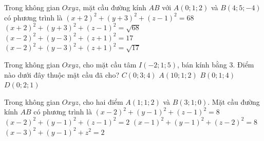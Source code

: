 \begin{ex}%
	 Trong không gian $Oxyz$, mặt cầu đường kính $AB$ với $A\left(0;1;2\right)$ và $B\left(4;5;-4\right)$ có phương trình là
	 \choice
		 {$\left(x+2\right)^2+\left(y+3\right)^2+\left(z-1\right)^2=68$}
		{$\left(x+2\right)^2+\left(y+3\right)^2+\left(z-1\right)^2=\sqrt{68}$} 
		{\True  $\left(x-2\right)^2+\left(y-3\right)^2+\left(z+1\right)^2=17$}
		{$\left(x-2\right)^2+\left(y-3\right)^2+\left(z+1\right)^2=\sqrt{17}$} 
\end{ex}

\begin{ex}%
	Trong không gian $Oxyz$, cho mặt cầu tâm $I(-2;1;5)$, bán kính bằng $3$. Điểm nào dưới đây  thuộc mặt cầu đã cho?
	\choice 
		{\True  $C(0;3;4)$}
		 {$A(10;1;2)$}
		{$B(0;1;4)$} 
		 {$D(0;2;1)$}
\end{ex}

\begin{ex}%
	Trong không gian $Oxyz$, cho hai điểm $A\left(1;1;2\right)$ và  $B\left(3;1;0\right)$. Mặt cầu đường kính $AB$ có phương trình là
	\choice 
		 {$\left(x-2\right)^2+\left(y-1\right)^2+\left(z-1\right)^2=8$}
		{$\left(x-2\right)^2+\left(y-1\right)^2+\left(z-1\right)^2=2$} 
		{$\left(x-1\right)^2+\left(y-1\right)^2+\left(z-2\right)^2=8$} 
		{$\left(x-3\right)^2+\left(y-1\right)^2+z^2=2$} 
\end{ex}

